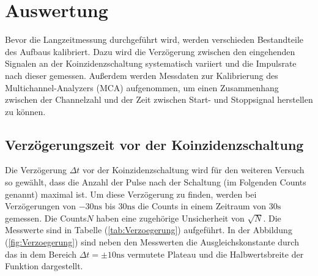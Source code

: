 \section{Auswertung}
\label{sec:Auswertung}
Bevor die Langzeitmessung durchgeführt wird, werden verschieden
Bestandteile des Aufbaus kalibriert. Dazu wird die Verzögerung 
zwischen den eingehenden Signalen an der Koinzidenzschaltung 
systematisch variiert und die Impulsrate nach dieser gemessen. 
Außerdem werden Messdaten zur Kalibrierung des Multichannel-Analyzers 
(MCA) aufgenommen, um einen Zusammenhang zwischen der Channelzahl und 
der Zeit zwischen Start- und Stoppsignal herstellen zu können.
\FloatBarrier
\subsection{Verzögerungszeit vor der Koinzidenzschaltung}
Die Verzögerung $\Delta t $ vor der Koinzidenzschaltung wird für 
den weiteren Versuch so gewählt, dass die 
Anzahl der Pulse nach der Schaltung (im Folgenden Counts genannt)
 maximal ist. Um diese Verzögerung 
zu finden, werden bei Verzögerungen von $-30 \unit{\nano\second}$ bis 
$30 \unit{\nano\second}$ die Counts in einem 
Zeitraum von $30 \unit{\second}$ gemessen. 
Die Counts$N$ haben eine zugehörige 
Unsicherheit von $\sqrt{N}$. 
Die Messwerte sind in Tabelle (\ref{tab:Verzoegerung}) aufgeführt. In
der Abbildung (\ref{fig:Verzoegerung}) sind neben den Messwerten die
Ausgleichskonstante durch das in dem Bereich 
$\Delta t = \pm 10 \unit{\nano\second}$ vermutete Plateau und die 
Halbwertsbreite der Funktion dargestellt.     

